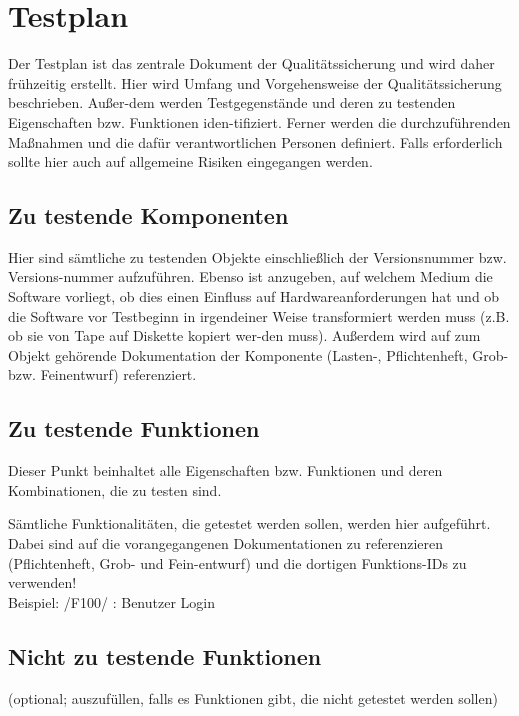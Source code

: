 
\chapter{Testplan}
Der Testplan ist das zentrale Dokument der Qualitätssicherung und wird daher
frühzeitig erstellt. Hier wird Umfang und Vorgehensweise der Qualitätssicherung
beschrieben. Außer-dem werden Testgegenstände und deren zu testenden
Eigenschaften bzw. Funktionen iden-tifiziert. Ferner werden die
durchzuführenden Maßnahmen und die dafür verantwortlichen Personen definiert.
Falls erforderlich sollte hier auch auf allgemeine Risiken eingegangen werden.

\section{Zu testende Komponenten}
Hier sind sämtliche zu testenden Objekte einschließlich der Versionsnummer bzw.
Versions-nummer aufzuführen. Ebenso ist anzugeben, auf welchem Medium die
Software vorliegt, ob dies einen Einfluss auf Hardwareanforderungen hat und ob
die Software vor Testbeginn in irgendeiner Weise transformiert werden muss
(z.B. ob sie von Tape auf Diskette kopiert wer-den muss). Außerdem wird auf zum
Objekt gehörende Dokumentation der Komponente (Lasten-, Pflichtenheft, Grob-
bzw. Feinentwurf) referenziert.

\section{Zu testende Funktionen}
Dieser Punkt beinhaltet alle Eigenschaften bzw. Funktionen und deren
Kombinationen, die zu testen sind.

Sämtliche Funktionalitäten, die getestet werden sollen, werden hier aufgeführt.
Dabei sind auf die vorangegangenen Dokumentationen zu referenzieren
(Pflichtenheft, Grob- und Fein-entwurf) und die dortigen Funktions-IDs zu
verwenden!\\ Beispiel: /F100/ : Benutzer Login


\section{Nicht zu testende Funktionen}
(optional; auszufüllen, falls es Funktionen gibt, die nicht getestet werden
sollen)\\

